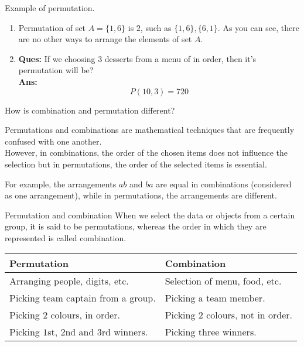 \documentclass{beamer}
\begin{document}
	\begin{frame}{Example of permutation.}
		\begin{enumerate}
			\item Permutation of set $A = \{1,6\}$ is $2$, such as $\{1,6\}, \{6,1\}$. As you can see, there are no other ways to arrange the elements of set $A$.
			\item \textbf{Ques:} If we choosing $3$ desserts from a menu of in order, then it's permutation will be? \\ \textbf{Ans:} \[P(10,3) = 720\]
		\end{enumerate}
	\end{frame}
	
	\begin{frame}{How is combination and permutation different?}
		\begin{block}{}
		Permutations and combinations are mathematical techniques that are frequently confused with one another. \pause \\ However, in combinations, the order of the chosen items does not influence the selection but in permutations, the order of the selected items is essential.
		\end{block}
 \pause
 \begin{block}{}
 For example, the arrangements $ab$ and $ba$ are equal in combinations (considered as one arrangement), while in permutations, the arrangements are different.
 \end{block}
\pause
		\begin{block}{Permutation and combination}
			When we select the data or objects from a certain group, it is said to be permutations, whereas the order in which they are represented is called combination.
		\end{block}
	\end{frame}
	
	\begin{frame}
		\begin{tabular}{|l|l|} \hline
			\bf{Permutation} & \bf{Combination} \\ \hline
			Arranging people, digits, etc. & Selection of menu, food, etc. \\ \hline
			Picking team captain from a group. & Picking a team member. \\ \hline
			Picking $2$ colours, in order. & Picking $2$ colours, not in order. \\ \hline
			Picking $1$st, $2$nd and $3$rd winners. & Picking three winners. \\ \hline
		\end{tabular}
	\end{frame}
	
\end{document}
